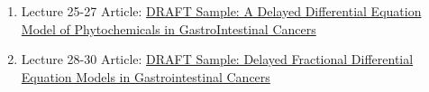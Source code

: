 \documentclass{TMLSStyleGuideResumeVitae}
\begin{document}
\begin{enumerate}
\item Lecture 25-27 Article: \href{}{DRAFT Sample: 
A Delayed Differential Equation Model of 
Phytochemicals in GastroIntestinal Cancers}
\item Lecture 28-30 Article: \href{}{DRAFT Sample: 
Delayed Fractional Differential 
Equation Models in Gastrointestinal Cancers}
\end{enumerate}
\end{document}
